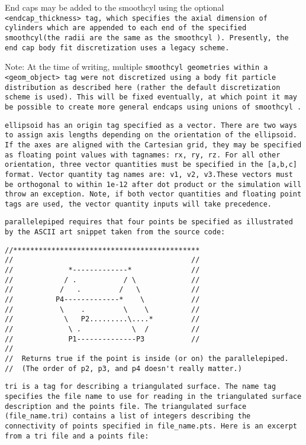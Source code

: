 End caps may be added to the smoothcyl using the optional \tt
<endcap\_thickness> \normalfont tag, which specifies the axial
dimension of cylinders which are appended to each end of the specified
\tt smoothcyl\normalfont (the radii are the same as the \tt smoothcyl
\normalfont).  Presently, the end cap body fit discretization uses a
legacy scheme.

Note: At the time of writing, multiple \tt smoothcyl \normalfont
geometries within a \tt <geom\_object> \normalfont tag were not
discretized using a body fit particle distribution as described here
(rather the default discretization scheme is used).  This will be
fixed eventually, at which point it may be possible to create more
general endcaps using unions of \tt smoothcyl \normalfont.

\tt ellipsoid \normalfont has an origin tag specified as a vector.  There are
two ways to assign axis lengths depending on the orientation of the ellipsoid.
If the axes are aligned with the Cartesian grid, they may be specified as
floating point values with tagnames: rx, ry, rz.  For all other orientation,
three vector quantities must be specified in the \tt [a,b,c] \normalfont format.
Vector quantity tag names are: v1, v2, v3.These vectors must be orthogonal
to within 1e-12 after dot product or the simulation will throw an exception.
Note, if both vector quantities and floating point tags are used,
the vector quantity inputs will take precedence.

\tt parallelepiped \normalfont requires that four points be specified as
illustrated by the ASCII art snippet taken from the source code:

\begin{Verbatim}[fontsize=\footnotesize]
//********************************************
//                                          //
//             *-------------*              //
//            / .           / \             //
//           /   .         /   \            //
//          P4-------------*    \           //
//           \    .         \    \          //
//            \   P2.........\....*         //
//             \ .            \  /          //
//             P1--------------P3           //
//
//  Returns true if the point is inside (or on) the parallelepiped.
//  (The order of p2, p3, and p4 doesn't really matter.)
\end{Verbatim}

\tt tri \normalfont is a tag for describing a triangulated surface.
The name tag specifies the file name to use for reading in the
triangulated surface description and the points file.  The
triangulated surface (file\_name.tri) contains a list of integers
describing the connectivity of points specified in file\_name.pts.
Here is an excerpt from a tri file and a points file:


